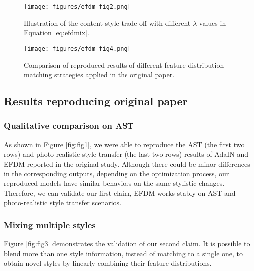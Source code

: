 
\begin{figure}[!t]  
    \centering
  \texttt{[image: figures/efdm\_fig2.png]}  
  \caption{Illustration of the content-style trade-off with different $\lambda$ values in Equation \ref{eq:efdmix}.}
\label{fig:fig2}
\end{figure}

\begin{figure}[!t]  
    \centering
  \texttt{[image: figures/efdm\_fig4.png]}  
  \caption{Comparison of reproduced results of different feature distribution matching strategies applied in the original paper.}
\label{fig:fig4}
\end{figure}

\subsection{Results reproducing original paper} 

\subsubsection{Qualitative comparison on AST}
As shown in Figure \ref{fig:fig1}, we were able to reproduce the AST (the first two rows) and photo-realistic style transfer (the last two rows) results of AdaIN and EFDM reported in the original study. Although there could be minor differences in the corresponding outputs, depending on the optimization process, our reproduced models have similar behaviors on the same stylistic changes. Therefore, we can validate our first claim, EFDM works stably on AST and photo-realistic style transfer scenarios.  

\subsubsection{Mixing multiple styles}
Figure \ref{fig:fig3} demonstrates the validation of our second claim. It is possible to blend more than one style information, instead of matching to a single one, to obtain novel styles by linearly combining their feature distributions. 


